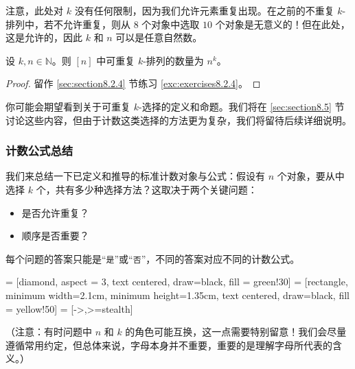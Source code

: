 注意，此处对 $k$ 没有任何限制，因为我们允许元素重复出现。在之前的不重复 $k$-排列中，若不允许重复，则从 $8$ 个对象中选取 $10$ 个对象是无意义的！但在此处，这是允许的，因此 $k$ 和 $n$ 可以是任意自然数。

\begin{proposition}\label{prop:proposition8.2.21}
    设 $k, n \in \mathbb{N}$。则 $[n]$ 中可重复 $k$-排列的数量为 $n^k$。
\end{proposition}

\begin{proof}
    留作 \ref{sec:section8.2.4} 节练习 \ref{exc:exercises8.2.4}。
\end{proof}

你可能会期望看到关于可重复 $k$-选择的定义和命题。我们将在 \ref{sec:section8.5} 节讨论这些内容，但由于计数这类选择的方法更为复杂，我们将留待后续详细说明。

\subsubsection*{计数公式总结}\label{sec:section8.2.3}

我们来总结一下已定义和推导的标准计数对象与公式：假设有 $n$ 个对象，要从中选择 $k$ 个，共有多少种选择方法？这取决于两个关键问题：
\begin{itemize}
    \item 是否允许重复？
    \item 顺序是否重要？
\end{itemize}
每个问题的答案只能是``\verb|是|''或``\verb|否|''，不同的答案对应不同的计数公式。
\begin{center}
     = [diamond, aspect = 3, text centered, draw=black, fill = green!30]
     = [rectangle, minimum width=2.1cm, minimum height=1.35cm, text centered, draw=black, fill = yellow!50]
     = [->,>=stealth]
\end{center}
（注意：有时问题中 $n$ 和 $k$ 的角色可能互换，这一点需要特别留意！我们会尽量遵循常用约定，但总体来说，字母本身并不重要，重要的是理解字母所代表的含义。）

